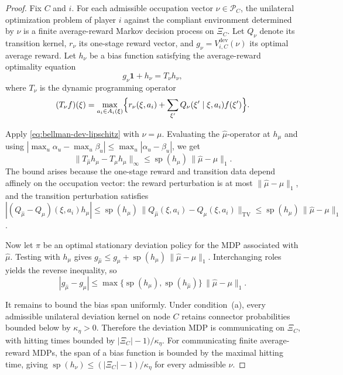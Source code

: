 \documentclass[12pt]{article}
\theoremstyle{definition}
\newcommand{\1}{\mathbf{1}}
\begin{document}
\begin{proof}
Fix \(C\) and \(i\). For each admissible occupation vector \(\nu\in\mathcal P_C\), the unilateral optimization problem of player \(i\) against the compliant environment determined by \(\nu\) is a finite average-reward Markov decision process on \(\Xi_C\). Let \(Q_\nu\) denote its transition kernel, \(r_\nu\) its one-stage reward vector, and \(g_\nu=V^{\mathrm{dev}}_{i,C}(\nu)\) its optimal average reward. Let \(h_\nu\) be a bias function satisfying the average-reward optimality equation
\begin{equation}\label{eq:bellman-dev-lipschitz}
g_\nu \mathbf 1 + h_\nu = T_\nu h_\nu,
\end{equation}
where \(T_\nu\) is the dynamic programming operator
\[
(T_\nu f)(\xi)=\max_{a_i\in A_i(\xi)}\Bigl\{r_\nu(\xi,a_i)+\sum_{\xi'}Q_\nu(\xi' \mid \xi,a_i)f(\xi')\Bigr\}.
\]

Apply \eqref{eq:bellman-dev-lipschitz} with \(\nu=\mu\). Evaluating the \(\widehat\mu\)-operator at \(h_\mu\) and using \(|\max_u \alpha_u-\max_u \beta_u|\le \max_u |\alpha_u-\beta_u|\), we get
\[
\|T_{\widehat\mu}h_\mu-T_\mu h_\mu\|_\infty
\le
\operatorname{sp}(h_\mu)\,\|\widehat\mu-\mu\|_1.
\]
The bound arises because the one-stage reward and transition data depend affinely on the occupation vector: the reward perturbation is at most \(\|\widehat\mu-\mu\|_1\), and the transition perturbation satisfies \(|(Q_{\widehat\mu}-Q_\mu)(\xi,a_i)h_\mu| \le \operatorname{sp}(h_\mu)\,\|Q_{\widehat\mu}(\xi,a_i)-Q_\mu(\xi,a_i)\|_{\mathrm{TV}} \le \operatorname{sp}(h_\mu)\,\|\widehat\mu-\mu\|_1\).

Now let \(\pi\) be an optimal stationary deviation policy for the MDP associated with \(\widehat\mu\). Testing with \(h_\mu\) gives \(g_{\widehat\mu} \le g_\mu+\operatorname{sp}(h_\mu)\,\|\widehat\mu-\mu\|_1\). Interchanging roles yields the reverse inequality, so
\[
|g_{\widehat\mu}-g_\mu|
\le
\max\{\operatorname{sp}(h_\mu),\operatorname{sp}(h_{\widehat\mu})\}\,\|\widehat\mu-\mu\|_1.
\]

It remains to bound the bias span uniformly. Under condition~(a), every admissible unilateral deviation kernel on node \(C\) retains connector probabilities bounded below by \(\kappa_\eta>0\). Therefore the deviation MDP is communicating on \(\Xi_C\), with hitting times bounded by \(|\Xi_C|-1)/\kappa_\eta\). For communicating finite average-reward MDPs, the span of a bias function is bounded by the maximal hitting time, giving \(\operatorname{sp}(h_\nu)\le (|\Xi_C|-1)/\kappa_\eta\) for every admissible \(\nu\).
\end{proof}
\end{document}
